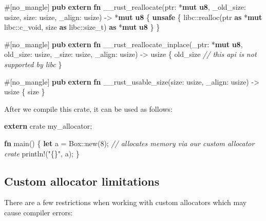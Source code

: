 \documentclass[a4paper,]{book}
\newenvironment{Shaded}{\begin{snugshade}}{\end{snugshade}}
\newcommand{\KeywordTok}[1]{\textcolor[rgb]{0.13,0.29,0.53}{\textbf{{#1}}}}
\newcommand{\DecValTok}[1]{\textcolor[rgb]{0.00,0.00,0.81}{{#1}}}
\newcommand{\StringTok}[1]{\textcolor[rgb]{0.31,0.60,0.02}{{#1}}}
\newcommand{\CommentTok}[1]{\textcolor[rgb]{0.56,0.35,0.01}{\textit{{#1}}}}
\newcommand{\OtherTok}[1]{\textcolor[rgb]{0.56,0.35,0.01}{{#1}}}
\newcommand{\NormalTok}[1]{{#1}}
\begin{document}
\begin{Shaded}
\begin{Highlighting}[]
\OtherTok{#[}\NormalTok{no_mangle}\OtherTok{]}
\KeywordTok{pub} \KeywordTok{extern} \KeywordTok{fn} \NormalTok{__rust_reallocate(ptr: *}\KeywordTok{mut} \KeywordTok{u8}\NormalTok{, _old_size: usize, size: usize,}
                                \NormalTok{_align: usize) -> *}\KeywordTok{mut} \KeywordTok{u8} \NormalTok{\{}
    \KeywordTok{unsafe} \NormalTok{\{}
        \NormalTok{libc::realloc(ptr }\KeywordTok{as} \NormalTok{*}\KeywordTok{mut} \NormalTok{libc::c_void, size }\KeywordTok{as} \NormalTok{libc::size_t) }\KeywordTok{as} \NormalTok{*}\KeywordTok{mut} \KeywordTok{u8}
    \NormalTok{\}}
\NormalTok{\}}

\OtherTok{#[}\NormalTok{no_mangle}\OtherTok{]}
\KeywordTok{pub} \KeywordTok{extern} \KeywordTok{fn} \NormalTok{__rust_reallocate_inplace(_ptr: *}\KeywordTok{mut} \KeywordTok{u8}\NormalTok{, old_size: usize,}
                                        \NormalTok{_size: usize, _align: usize) -> usize \{}
    \NormalTok{old_size }\CommentTok{// this api is not supported by libc}
\NormalTok{\}}

\OtherTok{#[}\NormalTok{no_mangle}\OtherTok{]}
\KeywordTok{pub} \KeywordTok{extern} \KeywordTok{fn} \NormalTok{__rust_usable_size(size: usize, _align: usize) -> usize \{}
    \NormalTok{size}
\NormalTok{\}}
\end{Highlighting}
\end{Shaded}

After we compile this crate, it can be used as follows:

\begin{Shaded}
\begin{Highlighting}[]
\KeywordTok{extern} \NormalTok{crate my_allocator;}

\KeywordTok{fn} \NormalTok{main() \{}
    \KeywordTok{let} \NormalTok{a = Box::new(}\DecValTok{8}\NormalTok{); }\CommentTok{// allocates memory via our custom allocator crate}
    \OtherTok{println!}\NormalTok{(}\StringTok{"\{\}"}\NormalTok{, a);}
\NormalTok{\}}
\end{Highlighting}
\end{Shaded}

\subsection{Custom allocator
limitations}\label{custom-allocator-limitations}

There are a few restrictions when working with custom allocators which
may cause compiler errors:
\end{document}
